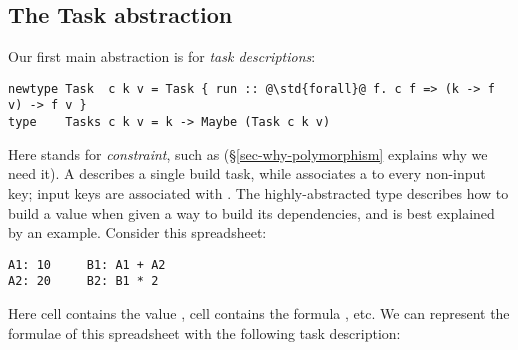 \subsection{The Task abstraction}\label{sec-task}

Our first main abstraction is for \emph{task descriptions}:
\begin{verbatim}
newtype Task  c k v = Task { run :: @\std{forall}@ f. c f => (k -> f v) -> f v }
type    Tasks c k v = k -> Maybe (Task c k v)
\end{verbatim}

\noindent
Here  stands for \emph{constraint}, such as 
(\S\ref{sec-why-polymorphism} explains why we need it).
A  describes a single build task, while  associates a
 to every non-input key; input keys are associated with .
The highly-abstracted type  describes how to build a value when given
a way to build its dependencies, and is best explained by an example.
Consider this \Excel spreadsheet:

\begin{verbatim}
A1: 10     B1: A1 + A2
A2: 20     B2: B1 * 2
\end{verbatim}

\noindent
Here cell  contains the value , cell  contains the
formula , etc. We can represent the formulae of this spreadsheet
with the following task description:


